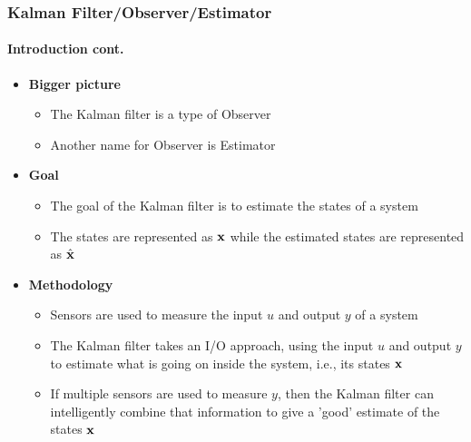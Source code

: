 \documentclass{beamer}
\begin{document}
\begin{frame}
\frametitle{Kalman Filter/Observer/Estimator}
\framesubtitle{Introduction \tiny cont.}

\scriptsize
\begin{itemize}
\item \textbf{Bigger picture}
\begin{itemize}\scriptsize
\item The Kalman filter is a type of {\color{blue}Observer}
\item Another name for Observer is Estimator
\end{itemize}
\item \textbf{Goal}
\begin{itemize}\scriptsize
\item The goal of the Kalman filter is to estimate the states of a system
\item The states are represented as $\textbf{x}$ while the estimated states are represented as $\hat{\textbf{x}}$
\end{itemize}
\item \textbf{Methodology}
\begin{itemize}\scriptsize
\item Sensors are used to measure the input $u$ and output $y$ of a system
\item The Kalman filter takes an I/O approach, using the input $u$ and output $y$ to estimate what is going on inside the system, i.e., its states $\textbf{x}$
\item If multiple sensors are used to measure $y$, then the Kalman filter can intelligently combine that information to give a 'good' estimate of the states $\textbf{x}$
\end{itemize}
\end{itemize}
\end{frame}




%
\end{document}

